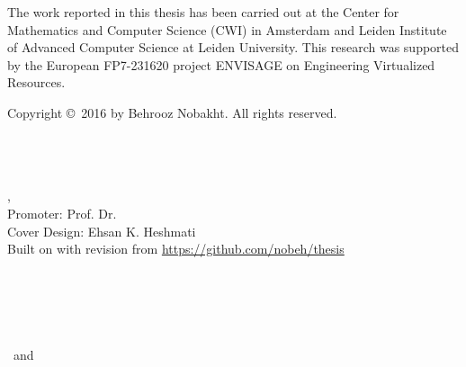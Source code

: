\begin{titlepage}
%
\noindent
The work reported in this thesis has been carried out at the Center for Mathematics and Computer Science (CWI) in Amsterdam and Leiden Institute of Advanced Computer Science at Leiden University.
This research was supported by the European FP7-231620 project ENVISAGE on Engineering Virtualized Resources.
\par\vspace {1cm}

%

%
\noindent%
Copyright \copyright\ 2016 by Behrooz Nobakht. All rights reserved. \\ [2ex] %



	\thesisDate \\

\end{titlepage}


\hfill
\vfill
{
	\small
	\textbf{\thesisName} \\
	\textit{\thesisTitle} \\
	\thesisSubject, \thesisDate \\
	Promoter: Prof. Dr. \thesisFirstReviewer \\
	Cover Design: Ehsan K. Heshmati \\[1.5em]
	Built on \jtt{\gitAuthorIsoDate} with revision \jtt{\gitAbbrevHash} from \url{https://github.com/nobeh/thesis} \\[1.5em]
	\textbf{\thesisUniversity} \\
	\textit{\thesisUniversityGroup} \\
	\thesisUniversityInstitute \\
	\thesisUniversityDepartment \\
	\thesisUniversityStreetAddress \\
	\thesisUniversityPostalCode\ and \thesisUniversityCity
}
